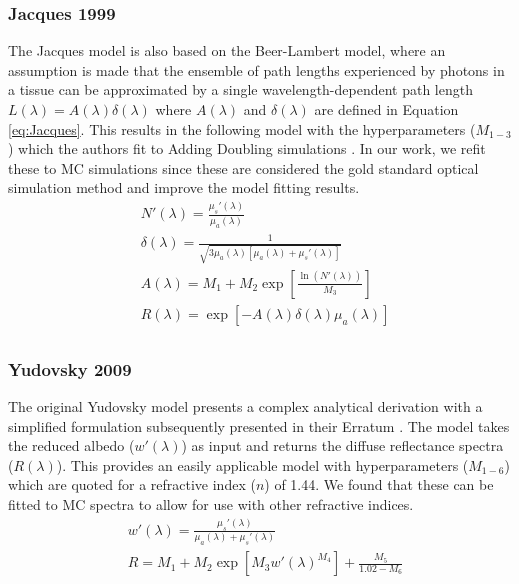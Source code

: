 \subsubsection{Jacques 1999}\label{sec:Jacques}
The Jacques model is also based on the Beer-Lambert model, where an assumption is made that the ensemble of path lengths experienced by photons in a tissue can be approximated by a single wavelength-dependent path length $L(\lambda) = A(\lambda)\delta(\lambda)$ where $A(\lambda)$ and $\delta(\lambda)$ are defined in Equation \ref{eq:Jacques}. This results in the following model with the hyperparameters ($M_{1-3}$) which the authors
fit
to Adding Doubling simulations \cite{Jacques1999}. In our work, we refit these to MC simulations since these are considered the gold standard optical simulation method and improve the model fitting results. 
\begin{equation}
\begin{aligned}
    & N'(\lambda) = \frac{\mu_s'(\lambda)}{\mu_a(\lambda)} \\
    & \delta(\lambda) = \frac{1}{\sqrt{3\mu_a(\lambda)[\mu_a(\lambda) + \mu_s'(\lambda)]}} \\
    & A(\lambda) = M_1 + M_2\exp \left[ \frac{\ln(N'(\lambda))}{M_3} \right] \\
    & R(\lambda) = \exp[-A(\lambda)\delta(\lambda)\mu_a(\lambda)] \\
\end{aligned}
\label{eq:Jacques}
\end{equation}

\subsubsection{Yudovsky 2009}\label{sec:Yudovskysingle}
The original Yudovsky model presents a complex analytical derivation \cite{Yudovsky2009} with a simplified formulation subsequently presented in their Erratum \cite{Yudovsky2015}. The model takes the reduced albedo ($w'(\lambda)$) as input and returns the diffuse reflectance spectra ($R(\lambda)$). This provides an easily applicable model with hyperparameters ($M_{1-6}$) which are quoted for a refractive index ($n$) of 1.44. We found that these can be fitted to MC spectra to allow for use with other refractive indices. 
\begin{equation}
\begin{aligned}
    & w'(\lambda) = \frac{\mu_s'(\lambda)}{\mu_a(\lambda) + \mu_s'(\lambda)} \\
    & R = M_1 + M_2\exp{\left[ M_3w'(\lambda)^{M_4}\right]} + \frac{M_5}{1.02 - M_6} \\
\end{aligned}
\label{eq:Yudovskysingle}
\end{equation} 

